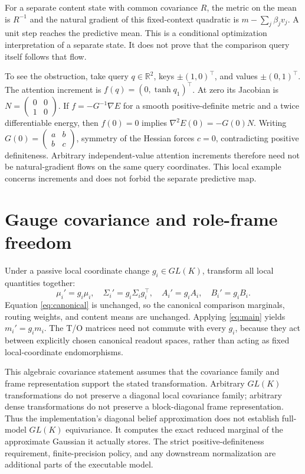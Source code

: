 \documentclass[11pt,letterpaper]{article}
\newcommand{\R}{\mathbb R}
\begin{document}
For a separate content state with common covariance $R$, the metric on the mean is $R^{-1}$ and the natural gradient of this fixed-context quadratic is $m-\sum_j\beta_jv_j$. A unit step reaches the predictive mean. This is a conditional optimization interpretation of a separate state. It does not prove that the comparison query itself follows that flow.

To see the obstruction, take query $q\in\R^2$, keys $\pm(1,0)^\top$, and values $\pm(0,1)^\top$. The attention increment is $f(q)=(0,\tanh q_1)^\top$. At zero its Jacobian is $N=\left(\begin{smallmatrix}0&0\\1&0\end{smallmatrix}\right)$. If $f=-G^{-1}\nabla E$ for a smooth positive-definite metric and a twice differentiable energy, then $f(0)=0$ implies $\nabla^2E(0)=-G(0)N$. Writing $G(0)=\left(\begin{smallmatrix}a&b\\b&c\end{smallmatrix}\right)$, symmetry of the Hessian forces $c=0$, contradicting positive definiteness. Arbitrary independent-value attention increments therefore need not be natural-gradient flows on the same query coordinates. This local example concerns increments and does not forbid the separate predictive map.

\section{Gauge covariance and role-frame freedom}
Under a passive local coordinate change $g_i\in GL(K)$, transform all local quantities together:
\begin{equation}
 \mu_i'=g_i\mu_i,\quad\Sigma_i'=g_i\Sigma_i g_i^\top,\quad
 A_i'=g_iA_i,\quad B_i'=g_iB_i.
\end{equation}
Equation \eqref{eq:canonical} is unchanged, so the canonical comparison marginals, routing weights, and content means are unchanged. Applying \eqref{eq:main} yields $m_i'=g_im_i$. The T/O matrices need not commute with every $g_i$, because they act between explicitly chosen canonical readout spaces, rather than acting as fixed local-coordinate endomorphisms.

This algebraic covariance statement assumes that the covariance family and frame representation support the stated transformation. Arbitrary $GL(K)$ transformations do not preserve a diagonal local covariance family; arbitrary dense transformations do not preserve a block-diagonal frame representation. Thus the implementation's diagonal belief approximation does not establish full-model $GL(K)$ equivariance. It computes the exact reduced marginal of the approximate Gaussian it actually stores. The strict positive-definiteness requirement, finite-precision policy, and any downstream normalization are additional parts of the executable model.
\end{document}
